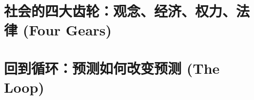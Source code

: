 \documentclass[openany, a4paper, 12pt]{book}
\begin{document}
\part{社会的四大齿轮：观念、经济、权力、法律 (Four Gears)}






\part{回到循环：预测如何改变预测 (The Loop)}



\appendix


\backmatter

\end{document}
